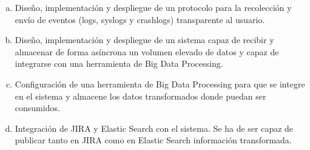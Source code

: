 \begin{enumerate}[a)]
	\item Diseño, implementación y despliegue de un protocolo para la recolección y envío de eventos (logs, syslogs y crashlogs) transparente al usuario.
	
	\item Diseño, implementación y despliegue de un sistema capaz de recibir y almacenar de forma asíncrona un volumen elevado de datos y capaz de integrarse con una herramienta de Big Data Processing.
	
	\item Configuración de una herramienta de Big Data Processing para que se integre en el sistema y almacene los datos transformados donde puedan ser consumidos.
	
	\item Integración de JIRA y Elastic Search con el sistema. Se ha de ser capaz de publicar tanto en JIRA como en Elastic Search información transformada.
\end{enumerate}

